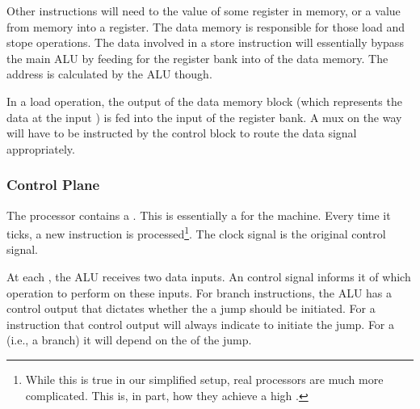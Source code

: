 Other instructions will need to  the value of some register in memory, or  a value from memory into a register. The data memory is responsible for those load and stope operations. The data involved in a store instruction will essentially bypass the main ALU by feeding  for the register bank into  of the data memory. The address is calculated by the ALU though.

In a load operation, the  output of the data memory block (which represents the data at the input ) is fed into the  input of the register bank. A mux on the way will have to be instructed by the control block to route the data signal appropriately.


\subsubsection{Control Plane}
\label{sec:bg:machine:control_plane}

The processor contains a . This is essentially a  for the machine. Every time it ticks, a new instruction is processed\footnote{While this is true in our simplified setup, real processors are much more complicated. This is, in part, how they achieve a high .}. The clock signal is the original control signal.

At each , the ALU receives two data inputs. An  control signal informs it of which operation to perform on these inputs. For branch instructions, the ALU has a control output that dictates whether the a jump should be initiated. For a  instruction that control output will always indicate to initiate the jump. For a  (i.e., a branch) it will depend on the  of the jump.

